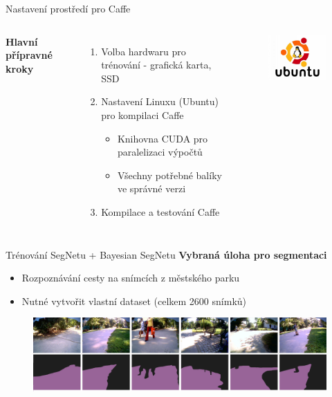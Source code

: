 \documentclass[aspectratio=1610]{beamer}
\begin{document}
\begin{frame}{Nastavení prostředí pro Caffe}
	\begin{columns}[T]
    { 		
		\textbf{Hlavní přípravné kroky}
		\begin{enumerate}
			\item Volba hardwaru pro trénování - grafická karta, SSD
			\item Nastavení Linuxu (Ubuntu) pro kompilaci Caffe
			\begin{itemize}
				\item Knihovna CUDA pro paralelizaci výpočtů
				\item Všechny potřebné balíky ve správné verzi
			\end{itemize}
			\item Kompilace a testování Caffe					
		\end{enumerate}
	}
	\begin{figure}[h]
		\centering
			\includegraphics[width=4cm, keepaspectratio]{ubuntu.jpg}			
	\end{figure}
	\end{columns}
\end{frame}
\begin{frame}{Trénování SegNetu + Bayesian SegNetu}
\textbf{Vybraná úloha pro segmentaci}
	\begin{itemize}
		\item Rozpoznávání cesty na snímcích z městského parku
		\item Nutné vytvořit vlastní dataset (celkem 2600 snímků)
	\end{itemize}
	\vspace{5mm}
	\begin{figure}[h]
	\centering
	\includegraphics[width=13cm, keepaspectratio]{result.png}			
	\end{figure}	
\end{frame}
\end{document}
